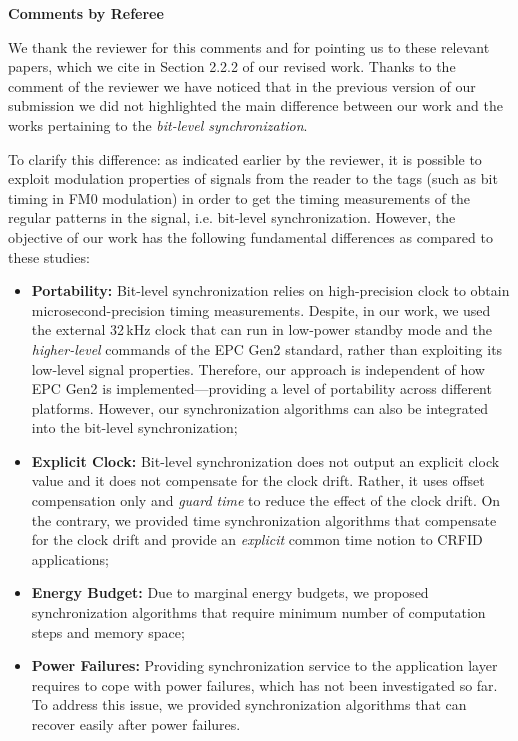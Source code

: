 \documentclass[10pt]{article}
\newcommand{\response}[1]{{\color{blue} #1}}
\newcounter{refereeCounter}
\newenvironment{responses}{%
\refstepcounter{refereeCounter}%
\textbf{\large Comments by Referee \therefereeCounter}
\begin{enumerate}%
\renewcommand{\labelenumi}{\textbf{[R\therefereeCounter :\,\arabic{enumi}]}} %
}{\end{enumerate}}
\begin{document}
\begin{responses}
\response{We thank the reviewer for this comments and for pointing us to these relevant papers, which we cite in Section 2.2.2 of our revised work. Thanks to the comment of the reviewer we have noticed that in the previous version of our submission we did not highlighted the main difference between our work and the works pertaining to the \emph{bit-level synchronization}.

To clarify this difference: as indicated earlier by the reviewer, it is possible to exploit modulation properties of signals from the reader to the tags (such as bit timing in FM0 modulation) in order to get the timing measurements of the regular patterns in the signal, i.e. bit-level synchronization. However, the objective of our work has the following fundamental differences as compared to these studies:

\begin{itemize}
	\item \textbf{Portability:} Bit-level synchronization relies on high-precision clock to obtain microsecond-precision timing measurements. Despite, in our work, we used the external 32\,kHz clock that can run in low-power standby mode and the \emph{higher-level} commands of the EPC Gen2 standard, rather than exploiting its low-level signal properties. Therefore, our approach is independent of how EPC Gen2 is implemented---providing a level of portability across different platforms. However, our synchronization algorithms can also be integrated into the bit-level synchronization;
	
	\item \textbf{Explicit Clock:} Bit-level synchronization does not output an explicit clock value and it does not compensate for the clock drift. Rather, it uses offset compensation only and \emph{guard time} to reduce the effect of the clock drift. On the contrary, we provided time synchronization algorithms that compensate for the clock drift and provide an \emph{explicit} common time notion to CRFID applications;
	
	\item \textbf{Energy Budget:} Due to marginal energy budgets, we proposed synchronization algorithms that require minimum number of computation steps and memory space;
	
	\item \textbf{Power Failures:} Providing synchronization service to the application layer requires to cope with power failures, which has not been investigated so far. To address this issue, we provided synchronization algorithms that can recover easily after power failures.
\end{itemize}

}
\end{responses}
\end{document}
